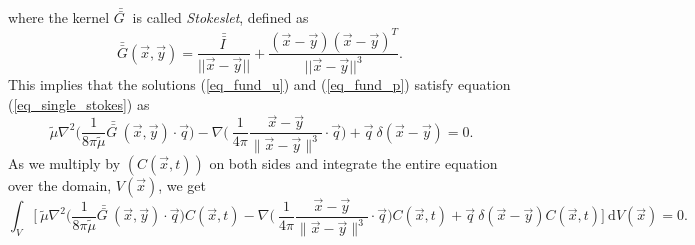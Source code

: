 where the kernel $\bar{\bar{G \ }}$ is called \textit{Stokeslet}, defined as 
\begin{equation}
	\bar{\bar{G}}( \vec{x}, \vec{y}) = 
	\frac{\bar{\bar{I \ }}}{||\vec{x}-\vec{y} ||} + \frac{(\vec{x}-\vec{y})(\vec{x}-\vec{y})^T}{||\vec{x}-\vec{y} ||^3}.
\end{equation} 
This implies that the solutions (\ref{eq_fund_u}) and (\ref{eq_fund_p}) satisfy equation (\ref{eq_single_stokes}) as
\begin{equation}
	\ \tilde{\mu} \nabla^2 
	\biggl( \frac{1}{8\pi \tilde{\mu}}  \bar{\bar{G \ }}(\vec{x}, \vec{y})
	\cdot  \vec{q} \biggr)
	- \nabla \biggl(\ \frac{1}{4\pi }  
	\frac{\vec{x} - \vec{y}}{\| \vec{x} - \vec{y}\|^3}
	\cdot  \vec{q} \biggr)
	+ \vec{q} \ \delta \left(\vec{x} - \vec{y} \right)
	=0.
\label{eq_single_stokes_sub}
\end{equation}
As we multiply by $\left( C(\vec{x}, t) \right)$ on both sides and integrate the entire equation over the domain, $V(\vec{x})$, we get
\begin{equation}
	\int_{V}
	\biggl[
	\ \tilde{\mu} \nabla^2 
	\biggl( \frac{1}{8\pi \tilde{\mu}}  \bar{\bar{G \ }}(\vec{x}, \vec{y})
	\cdot  \vec{q} \biggr)
	C(\vec{x}, t)
	-
	\nabla \biggl(\ \frac{1}{4\pi }  
	\frac{\vec{x} - \vec{y}}{\| \vec{x} - \vec{y}\|^3}
	\cdot  \vec{q} \biggr)
	C(\vec{x}, t)
	+ \vec{q} \ \delta \left(\vec{x} - \vec{y} \right)
	C(\vec{x}, t)
	\biggr]
	\ \textrm{d}V(\vec{x}) = 0 .
\label{eq_single_stokes_sub2}
\end{equation}

